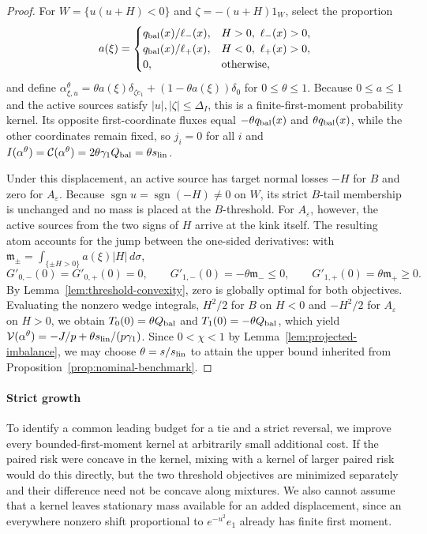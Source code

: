 \begin{proof}
For \(W=\{u(u+H)<0\}\) and \(\zeta=-(u+H)1_W\), select the proportion
\[
a(\xi)=
\begin{cases}
q_{\rm bal}(x)/\ell_-(x),&H>0,\ \ell_-(x)>0,\\
q_{\rm bal}(x)/\ell_+(x),&H<0,\ \ell_+(x)>0,\\
0,&\text{otherwise},
\end{cases}
\]
and define \(\alpha^\theta_{\xi,u}=\theta a(\xi)\delta_{\zeta e_1}+(1-\theta a(\xi))\delta_0\) for \(0\le\theta\le1\). Because \(0\le a\le1\) and the active sources satisfy \(|u|,|\zeta|\le\Delta_I\), this is a finite-first-moment probability kernel. Its opposite first-coordinate fluxes equal \(-\theta q_{\rm bal}(x)\) and \(\theta q_{\rm bal}(x)\), while the other coordinates remain fixed, so \(j_i=0\) for all \(i\) and \(I(\alpha^\theta)=\mathcal C(\alpha^\theta)=2\theta\gamma_1Q_{\rm bal}=\theta s_{\rm lin}\).

Under this displacement, an active source has target normal losses \(-H\) for \(B\) and zero for \(A_\varepsilon\). Because \(\operatorname{sgn}u=\operatorname{sgn}(-H)\ne0\) on \(W\), its strict \(B\)-tail membership is unchanged and no mass is placed at the \(B\)-threshold. For \(A_\varepsilon\), however, the active sources from the two signs of \(H\) arrive at the kink itself. The resulting atom accounts for the jump between the one-sided derivatives: with \(\mathfrak m_\pm=\int_{\{\pm H>0\}}a(\xi)|H|\,d\sigma\),
\[
G'_{0,-}(0)=G'_{0,+}(0)=0,\qquad
G'_{1,-}(0)=-\theta \mathfrak m_-\le0,\qquad
G'_{1,+}(0)=\theta \mathfrak m_+\ge0.
\]
By Lemma~\ref{lem:threshold-convexity}, zero is globally optimal for both objectives. Evaluating the nonzero wedge integrals, \(H^2/2\) for \(B\) on \(H<0\) and \(-H^2/2\) for \(A_\varepsilon\) on \(H>0\), we obtain \(T_0(0)=\theta Q_{\rm bal}\) and \(T_1(0)=-\theta Q_{\rm bal}\), which yield \(\mathcal V(\alpha^\theta)=-J/p+\theta s_{\rm lin}/(p\gamma_1)\). Since \(0<\chi<1\) by Lemma~\ref{lem:projected-imbalance}, we may choose \(\theta=s/s_{\rm lin}\) to attain the upper bound inherited from Proposition~\ref{prop:nominal-benchmark}.
\end{proof}

\paragraph{Strict growth} To identify a common leading budget for a tie and a strict reversal, we improve every bounded-first-moment kernel at arbitrarily small additional cost. If the paired risk were concave in the kernel, mixing with a kernel of larger paired risk would do this directly, but the two threshold objectives are minimized separately and their difference need not be concave along mixtures. We also cannot assume that a kernel leaves stationary mass available for an added displacement, since an everywhere nonzero shift proportional to \(e^{-u^2}e_1\) already has finite first moment.

